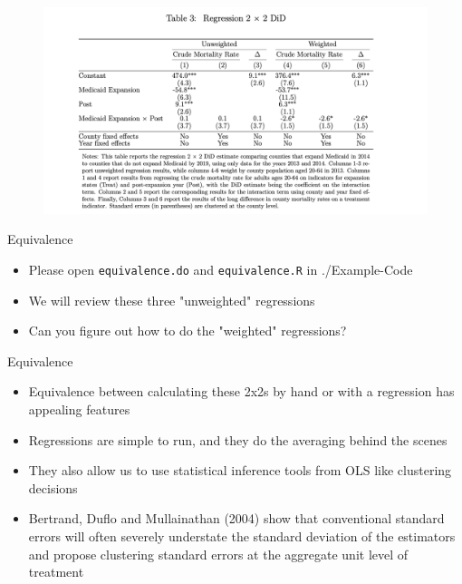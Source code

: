 \documentclass{beamer}
\begin{document}
\begin{frame}

\begin{figure}
    \centering
    \includegraphics[height=0.7\textheight]{./lecture_includes/regression2x2.png}
\end{figure}

\end{frame}

\begin{frame}{Equivalence}

\begin{itemize}
\item Please open \texttt{equivalence.do} and \texttt{equivalence.R} in ./Example-Code
\item We will review these three "unweighted" regressions
\item Can you figure out how to do the "weighted" regressions?

\end{itemize}

\end{frame}


\begin{frame}{Equivalence}

\begin{itemize}

\item Equivalence between calculating these 2x2s by hand or with a regression has appealing features
\item Regressions are simple to run, and they do the averaging behind the scenes
\item They also allow us to use statistical inference tools from OLS like clustering decisions
\item  Bertrand, Duflo and Mullainathan (2004) show that conventional standard errors will often severely understate the standard deviation of the estimators and propose clustering standard errors at the aggregate unit level of treatment
\end{itemize}

\end{frame}
\end{document}

